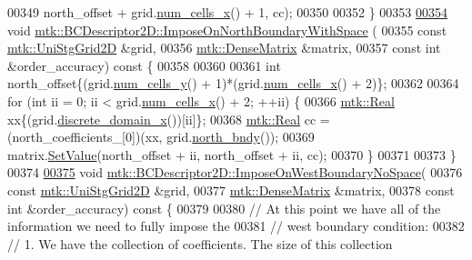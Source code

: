 \begin{DoxyCode}
00349                   north\_offset + grid.\hyperlink{classmtk_1_1UniStgGrid2D_a2d182866a398aba8e4829590e85bf939}{num\_cells\_x}() + 1, cc);
00350 
00352 \}
00353 
\hypertarget{mtk__bc__descriptor__2d_8cc_source_l00354}{}\hyperlink{classmtk_1_1BCDescriptor2D_a6b9b6f2bec06bce5a9070236ca10ec3a}{00354} \textcolor{keywordtype}{void} \hyperlink{classmtk_1_1BCDescriptor2D_a6b9b6f2bec06bce5a9070236ca10ec3a}{mtk::BCDescriptor2D::ImposeOnNorthBoundaryWithSpace}
      (
00355     \textcolor{keyword}{const} \hyperlink{classmtk_1_1UniStgGrid2D}{mtk::UniStgGrid2D} &grid,
00356     \hyperlink{classmtk_1_1DenseMatrix}{mtk::DenseMatrix} &matrix,
00357     \textcolor{keyword}{const} \textcolor{keywordtype}{int} &order\_accuracy)\textcolor{keyword}{ const }\{
00358 
00360 
00361   \textcolor{keywordtype}{int} north\_offset\{(grid.\hyperlink{classmtk_1_1UniStgGrid2D_aed05a801cc9a76dba0ff203cea58a61a}{num\_cells\_y}() + 1)*(grid.\hyperlink{classmtk_1_1UniStgGrid2D_a2d182866a398aba8e4829590e85bf939}{num\_cells\_x}() + 2)\};
00362 
00364   \textcolor{keywordflow}{for} (\textcolor{keywordtype}{int} ii = 0; ii < grid.\hyperlink{classmtk_1_1UniStgGrid2D_a2d182866a398aba8e4829590e85bf939}{num\_cells\_x}() + 2; ++ii) \{
00366     \hyperlink{group__c01-roots_gac080bbbf5cbb5502c9f00405f894857d}{mtk::Real} xx\{(grid.\hyperlink{classmtk_1_1UniStgGrid2D_ab2f70cf5cd0a2d5486992d9f2f8baa4a}{discrete\_domain\_x}())[ii]\};
00368     \hyperlink{group__c01-roots_gac080bbbf5cbb5502c9f00405f894857d}{mtk::Real} cc = (north\_coefficients\_[0])(xx, grid.\hyperlink{classmtk_1_1UniStgGrid2D_afe1ead253cdeb5503e0489eba8fd84e2}{north\_bndy}());
00369     matrix.\hyperlink{classmtk_1_1DenseMatrix_a784ce5784109ac86bfb9d8562b334b13}{SetValue}(north\_offset + ii, north\_offset + ii, cc);
00370   \}
00371 
00373 \}
00374 
\hypertarget{mtk__bc__descriptor__2d_8cc_source_l00375}{}\hyperlink{classmtk_1_1BCDescriptor2D_a0b153abdcb78c54197858148c9632517}{00375} \textcolor{keywordtype}{void} \hyperlink{classmtk_1_1BCDescriptor2D_a0b153abdcb78c54197858148c9632517}{mtk::BCDescriptor2D::ImposeOnWestBoundaryNoSpace}(
00376     \textcolor{keyword}{const} \hyperlink{classmtk_1_1UniStgGrid2D}{mtk::UniStgGrid2D} &grid,
00377     \hyperlink{classmtk_1_1DenseMatrix}{mtk::DenseMatrix} &matrix,
00378     \textcolor{keyword}{const} \textcolor{keywordtype}{int} &order\_accuracy)\textcolor{keyword}{ const }\{
00379 
00380   \textcolor{comment}{// At this point we have all of the information we need to fully impose the}
00381   \textcolor{comment}{// west boundary condition:}
00382   \textcolor{comment}{// 1. We have the collection of coefficients. The size of this collection}

\end{DoxyCode}
